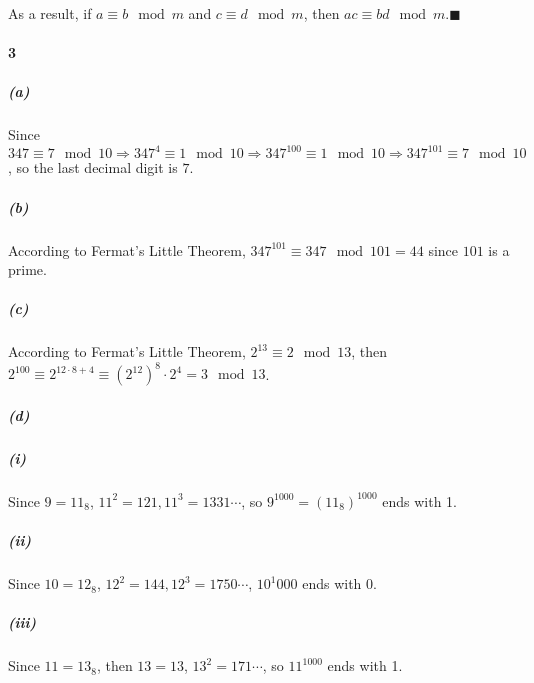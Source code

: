 \documentclass[11pt]{article}
\begin{document}
			As a result, if $a \equiv b \mod m$ and $c \equiv d \mod m$, then $ac \equiv bd \mod m$.$\blacksquare$
	\paragraph{3}
		\subparagraph{(a)}
			Since $347 \equiv 7 \mod 10 \Rightarrow 347^4 \equiv 1 \mod 10 \Rightarrow 347^{100} \equiv 1 \mod 10 \Rightarrow 347^{101} \equiv 7 \mod 10$, so the last decimal digit is $7$.
		\subparagraph{(b)}
			According to Fermat's Little Theorem, $347^{101} \equiv 347 \mod 101 = 44$ since $101$ is a prime.
		\subparagraph{(c)}
			According to Fermat's Little Theorem, $2^{13} \equiv 2 \mod 13$, then $2^{100} \equiv 2^{12 \cdot 8 + 4} \equiv (2^12)^8 \cdot 2^4 = 3 \mod 13$.
		\subparagraph{(d)}
		\subparagraph{(i)}
			Since $9 = 11_{8}$, $11^2 = 121, 11^3 = 1331 \cdots$, so $9^{1000} = (11_8)^{1000}$ ends with 1.
		\subparagraph{(ii)}
			Since $10 = 12_8$, $12^2 = 144, 12^3 = 1750 \cdots$, $10^1{000}$ ends with 0.
		\subparagraph{(iii)}
			Since $11 = 13_8$, then $13 = 13$, $13^2 = 171 \cdots$, so $11^{1000}$ ends with 1.
\end{document}
